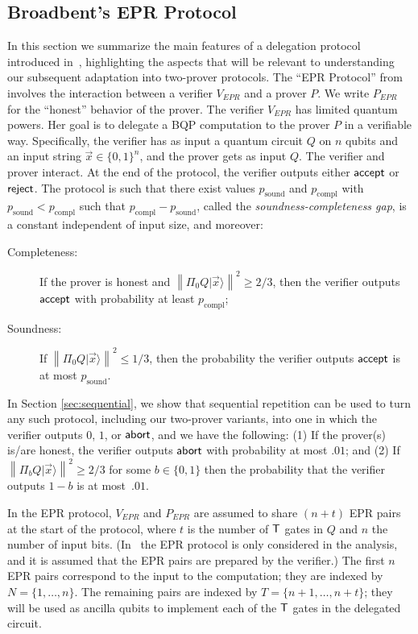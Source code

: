 \documentclass[11pt]{article}
\theoremstyle{remark}
\theoremstyle{definition}
\newcommand{\ket}[1]{|#1\rangle}
\newcommand{\norm}[1]{\left\|#1\right\|}
\begin{document}
\subsection{Broadbent's EPR Protocol}
\label{sec:EPR-protocol}


In this section we summarize the main features of a delegation protocol introduced in~\cite{broadbent15howtoverify}, highlighting the aspects that will be relevant to understanding our subsequent adaptation into two-prover protocols. The ``EPR Protocol'' from \cite{broadbent15howtoverify} involves the interaction between a verifier $V_{EPR}$ and a prover $P$. We write $P_{EPR}$ for the ``honest'' behavior of the prover. The verifier $V_{EPR}$ has limited quantum powers. Her goal is to delegate a BQP computation to the prover $P$ in a verifiable way. Specifically, the verifier has as input a quantum circuit $Q$ on $n$ qubits and an input string $\vec{x}\in\{0,1\}^n$, and the prover gets as input $Q$. The verifier and prover interact. At the end of the protocol, the verifier outputs either $\sf accept$ or $\sf reject$. The protocol is such that there exist values $p_{\mathrm{sound}}$ and $p_{\mathrm{compl}}$ with $p_{\mathrm{sound}}< p_{\mathrm{compl}}$ such that $p_{\mathrm{compl}}-p_{\mathrm{sound}}$, called the \emph{soundness-completeness gap}, is a constant independent of input size, and moreover:

\begin{description}
\item[Completeness:] If the prover is honest and $\norm{\Pi_0Q\ket{\vec{x}}}^2 \geq 2/3$, then the verifier outputs $\sf accept$ with probability at least $p_{\mathrm{compl}}$;  
\item[Soundness:] If $\norm{\Pi_0Q\ket{\vec{x}}}^2 \leq 1/3$, then the probability the verifier outputs $\sf accept$ is at most $p_{\mathrm{sound}}$.
\end{description}

In Section \ref{sec:sequential}, we show that sequential repetition can be used to turn any such protocol, including our two-prover variants, into one in which the verifier outputs $0$, $1$, or $\sf abort$, and we have the following: (1) If the prover(s) is/are honest, the verifier outputs $\sf abort$ with probability at most $.01$; and (2) If $\norm{\Pi_b Q\ket{\vec{x}}}^2 \geq 2/3$ for some $b\in\{0,1\}$ then the probability that the verifier outputs $1-b$ is at most~$.01$.



In the EPR protocol, $V_{EPR}$ and $P_{EPR}$ are assumed to share $(n+t)$ EPR pairs at the start of the protocol, where $t$ is the number of $\sf T$ gates in $Q$ and $n$ the number of input bits. (In~\cite{broadbent15howtoverify} the EPR protocol is only considered in the analysis, and it is assumed that the EPR pairs are prepared by the verifier.)
 The first $n$ EPR pairs correspond to the input to the computation; they are indexed by $N=\{1,\dots,n\}$. The remaining pairs are indexed by $T=\{n+1,\dots,n+t\}$; they will be used as ancilla qubits to  implement each of the $\sf T$ gates in the delegated circuit. 
\end{document}
